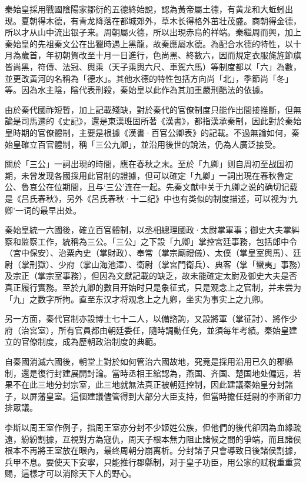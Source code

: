 秦始皇採用戰國陰陽家鄒衍的五德終始說，認為黃帝屬土德，有黄龙和大蚯蚓出现。夏朝得木德，有青龙降落在都城郊外，草木长得格外茁壮茂盛。商朝得金德，所以才从山中流出银子来。周朝屬火德，所以出現赤烏的祥端。秦繼周而興，加上秦始皇的先祖秦文公在出獵時遇上黑龍，故秦應屬水德。為配合水德的特性，以十月為歲首，年初朝賀改至十月一日進行，色尚黑、終數六，因而規定衣服旄旌節旗皆尚黑，符傳、法冠、輿乘（天子乘輿六尺、車駕六馬）等制度都以「六」為數，並更改黃河的名稱為「德水」。其他水德的特性包括方向尚「北」，季節尚「冬」等。因為水主陰，陰代表刑殺，秦始皇以此作為其加重嚴刑酷法的依據。

由於秦代國祚短暫，加上記載殘缺，對於秦代的官僚制度只能作出間接推斷，但無論是司馬遷的《史記》，還是東漢班固所著《漢書》，都指漢承秦制，因此對於秦始皇時期的官僚體制，主要是根據《漢書·百官公卿表》的記載。不過無論如何，秦始皇確立百官體制，稱「三公九卿」，並沿用後世的說法，仍為人廣泛接受。

關於「三公」一詞出現的時間，應在春秋之末。至於「九卿」则自周初至战国初期，未曾发现各國採用此官制的證據，但可以確定「九卿」一詞出現在春秋魯定公、魯哀公在位期間，且与‘三公’连在一起。先秦文献中关于九卿之说的确切记载是《吕氏春秋》，另外《呂氏春秋·十二纪》中也有类似的制度描述，可以视为‘九卿’一词的最早出处。

秦始皇統一六國後，確立百官體制，以丞相總理國政·太尉掌軍事；御史大夫掌糾察和监察工作，統稱為三公。「三公」之下設「九卿」掌控宮廷事務，包括郎中令（宮中保安）、治粟內史（掌財政）、奉常（掌宗廟禮儀）、太僕（掌皇室輿馬）、廷尉（掌刑獄）、少府（掌山海池澤）、衛尉（掌宮門衛兵）、典客（掌「蠻夷」事務）及宗正（掌宗室事務），但因為文獻記載的缺乏，故未能確定太尉及御史大夫是否真正履行實務。至於九卿的數目开始时只是象征式，只是观念上之官制，并未尝为「九」之数字所拘。直至东汉才将观念上之九卿，坐实为事实上之九卿。

另一方面，秦代官制亦設博士七十二人，以備諮詢，又設將軍（掌征討）、將作少府（治宮室），所有官員都由朝廷委任，隨時調動任免，並須每年考績。秦始皇建立的官僚制度，成為歷朝政治制度的典範。

自秦國消滅六國後，朝堂上對於如何管治六國故地，究竟是採用沿用已久的郡縣制，還是復行封建展開討論。當時丞相王綰認為，燕国、齐国、楚国地处偏远，若果不在此三地分封宗室，此三地就無法真正被朝廷控制，因此建議秦始皇分封諸子，以屏藩皇室。這個建議儘管得到大部分大臣支持，但當時擔任廷尉的李斯卻力排眾議。

李斯以周王室作例子，指周王室亦分封不少姬姓公族，但他們的後代卻因為血緣疏遠，紛紛割據，互視對方為寇仇，周天子根本無力阻止諸候之間的爭端，而且諸侯根本不再將王室放在眼內，最终周朝分崩离析。分封諸子只會導致日後諸侯割據，兵甲不息。要使天下安寧，只能推行郡縣制，对于皇子功臣，用公家的赋税重重赏赐，這樣才可以消除天下人的野心。

